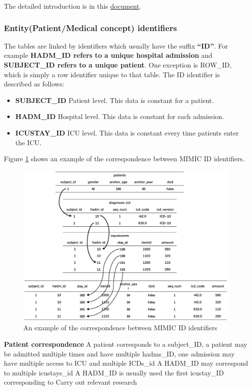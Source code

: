 The detailed introduction is in this \href{https://mimic.mit.edu/docs/}{document}.

\subsubsection{Entity(Patient/Medical concept) identifiers}
The tables are linked by identifiers which usually have the suffix \textbf{“ID”}. For example \textbf{HADM\_ID refers to a unique hospital admission} and \textbf{SUBJECT\_ID refers to a unique patient}. One exception is ROW\_ID, which is simply a row identifier unique to that table. The ID identifier is described as follows:
\begin{itemize}
\item \textbf{SUBJECT\_ID} Patient level. This data is constant for a patient.

\item \textbf{HADM\_ID} Hospital level. This data is constant for each admission.

\item \textbf{ICUSTAY\_ID} ICU level. This data is constant every time patients enter the ICU.
\end{itemize}

Figure \ref{fig:MIMIC_identifiers_correspondence} shows an example of the correspondence between MIMIC ID identifiers.

\begin{figure}[ht]
    \centering
    \includegraphics[width=0.8\linewidth]{images/MIMIC_identifiers_correspondence.png}
    \caption{An example of the correspondence between MIMIC ID identifiers}
    \label{fig:MIMIC_identifiers_correspondence}
\end{figure}


\textbf{Patient correspondence}
A patient corresponds to a subject\_ID, a patient may be admitted multiple times and have multiple hadms\_ID, one admission may have multiple access to ICU and multiple ICDs\_id
A HADM\_ID may correspond to multiple icustays\_id
A HADM\_ID is usually used the first icustay\_ID corresponding to Carry out relevant research

